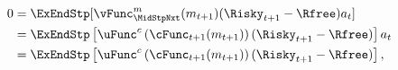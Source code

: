   \begin{equation}\begin{gathered}\begin{aligned}
        0  & = \ExEndStp[{\vFunc}_{\MidStpNxt}^{m}(m_{t+1})(\Risky_{t+1}-\Rfree){a}_{t}] \notag
        \\         & = \ExEndStp\left[\uFunc^{c}\left(\cFunc_{t+1}(m_{t+1})\right)(\Risky_{t+1}-\Rfree)\right]{a}_{t}
        \\         & = \ExEndStp\left[\uFunc^{c}\left(\cFunc_{t+1}(m_{t+1})\right)(\Risky_{t+1}-\Rfree)\right], \label{eq:FOCw}
      \end{aligned}\end{gathered}\end{equation}
